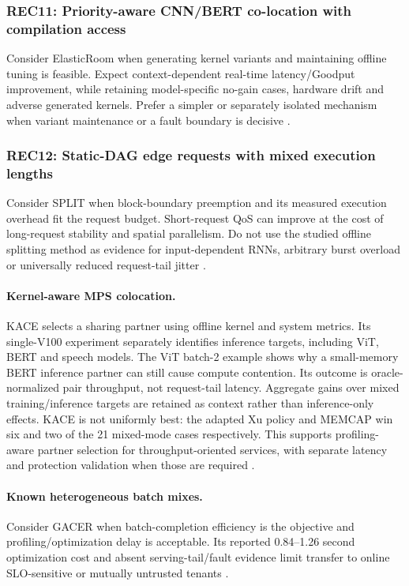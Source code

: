 \subsubsection*{REC11: Priority-aware CNN/BERT co-location with compilation access}
Consider ElasticRoom when generating kernel variants and maintaining offline tuning is feasible. Expect context-dependent real-time latency/Goodput improvement, while retaining model-specific no-gain cases, hardware drift and adverse generated kernels. Prefer a simpler or separately isolated mechanism when variant maintenance or a fault boundary is decisive \cite{s028}.
\subsubsection*{REC12: Static-DAG edge requests with mixed execution lengths}
Consider SPLIT when block-boundary preemption and its measured execution overhead fit the request budget. Short-request QoS can improve at the cost of long-request stability and spatial parallelism. Do not use the studied offline splitting method as evidence for input-dependent RNNs, arbitrary burst overload or universally reduced request-tail jitter \cite{s029}.

\paragraph{Kernel-aware MPS colocation.} KACE selects a sharing partner using offline kernel and system metrics. Its single-V100 experiment separately identifies inference targets, including ViT, BERT and speech models. The ViT batch-2 example shows why a small-memory BERT inference partner can still cause compute contention. Its outcome is oracle-normalized pair throughput, not request-tail latency. Aggregate gains over mixed training/inference targets are retained as context rather than inference-only effects. KACE is not uniformly best: the adapted Xu policy and MEMCAP win six and two of the 21 mixed-mode cases respectively. This supports profiling-aware partner selection for throughput-oriented services, with separate latency and protection validation when those are required \cite{s030}.
\paragraph{Known heterogeneous batch mixes.} Consider GACER when batch-completion efficiency is the objective and profiling/optimization delay is acceptable. Its reported 0.84--1.26 second optimization cost and absent serving-tail/fault evidence limit transfer to online SLO-sensitive or mutually untrusted tenants \cite{s027}.
